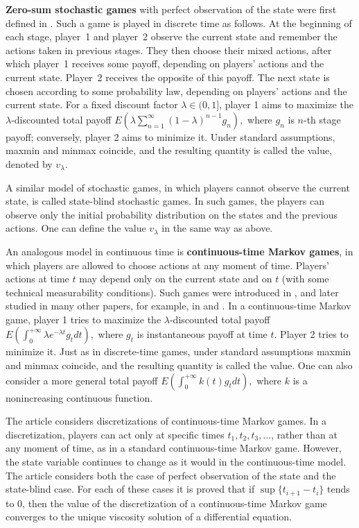 \documentclass[english,openary,12pt]{article}
\theoremstyle{definition}
\begin{document}
\textbf{Zero-sum stochastic games} 
with perfect observation of the state were first defined in \cite{Sha53}. Such a game is played in discrete time as follows. At the beginning of each stage, player~1 and player~2 observe the current state and remember the actions taken in previous stages. They then choose their mixed actions, after which player~1 receives some payoff, depending on players' actions and the current state. Player~2 receives the opposite of this payoff. The next state is chosen according to some probability law, depending on players' actions and the current state. For a fixed discount factor $\lambda \in (0,1]$, player 1 aims to maximize the $\lambda$-discounted total payoff
$E\left(\lambda \sum\limits_{n = 1}^\infty (1-\lambda)^{n-1} g_n\right),$
where $g_n$ is $n$-th stage payoff; conversely, player 2 aims to minimize it. Under standard assumptions, maxmin and minmax coincide, and the resulting quantity is called the value, denoted by $v_\lambda$.

A similar model of stochastic games, in which players cannot observe the current state, is called state-blind stochastic games. In such games, the players can observe only the initial probability distribution on the states and the previous actions. One can define the value $v_\lambda$ in the same way as above.

An analogous model in continuous time is \textbf{continuous-time Markov games}, in which players are allowed to choose actions at any moment of time. Players' actions at time $t$ may depend only on the current state and on $t$ (with some technical measurability conditions). Such games were introduced in \cite{Zac64}, and later studied in many other papers, for example, in \cite{GuoHer03} and \cite{GuoHer05}. In a continuous-time Markov game, player 1 tries to maximize the $\lambda$-discounted total payoff
$E(\int_0^{+\infty} \lambda e^{-\lambda t} g_t dt),$
where $g_t$ is instantaneous payoff at time $t$. Player 2 tries to minimize it. Just as in discrete-time games, under standard assumptions maxmin and minmax coincide, and the resulting quantity is called the value. One can also consider a more general total payoff $E(\int_0^{+\infty} k(t) g_t dt),$ where $k$ is a nonincreasing continuous function.

The article \cite{Sor17} considers discretizations of continuous-time Markov games. In a discretization, players can act only at specific times $t_1, t_2, t_3, \ldots$, rather than at any moment of time, as in a standard continuous-time Markov game. However, the state variable continues to change as it would in the continuous-time model. The article \cite{Sor17} considers both the case of perfect observation of the state and the state-blind case. For each of these cases it is proved that if $\sup\{t_{i+1} - t_i\}$ tends to $0$, then the value of the discretization of a continuous-time Markov game converges to the unique viscosity solution of a differential equation.
\end{document}
